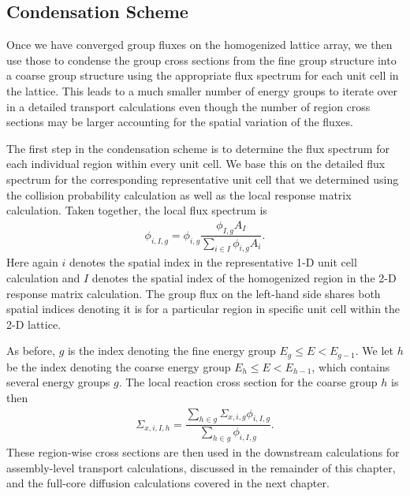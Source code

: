 \subsection{Condensation Scheme}

Once we have converged group fluxes on the homogenized lattice array, we then use those to condense the group cross sections from the fine group structure into a coarse group structure using the appropriate flux spectrum for each unit cell in the lattice. This leads to a much smaller number of energy groups to iterate over in a detailed transport calculations even though the number of region cross sections may be larger accounting for the spatial variation of the fluxes.

The first step in the condensation scheme is to determine the flux spectrum for each individual region within every unit cell. We base this on the detailed flux spectrum for the corresponding representative unit cell that we determined using the collision probability calculation as well as the local response matrix calculation. Taken together, the local flux spectrum is
\begin{align}
  \phi_{i,I,g} = \phi_{i,g} \dfrac{ \phi_{I,g} A_I }{ \displaystyle\sum_{i \in I} \phi_{i,g} A_i } .
\end{align}
Here again $i$ denotes the spatial index in the representative 1-D unit cell calculation and $I$ denotes the spatial index of the homogenized region in the 2-D response matrix calculation. The group flux on the left-hand side shares both spatial indices denoting it is for a particular region in specific unit cell within the 2-D lattice.

As before, $g$ is the index denoting the fine energy group $E_g \le E < E_{g-1}$. We let $h$ be the index denoting the coarse energy group $E_h \le E < E_{h-1}$, which contains several energy groups $g$. The local reaction cross section for the coarse group $h$ is then
\begin{align}
  \Sigma_{x,i,I,h} = \dfrac{ \displaystyle\sum_{h \in g} \Sigma_{x,i,g} \phi_{i,I,g} }{ \displaystyle\sum_{h \in g} \phi_{i,I,g}  } .
\end{align}
These region-wise cross sections are then used in the downstream calculations for assembly-level transport calculations, discussed in the remainder of this chapter, and the full-core diffusion calculations covered in the next chapter.






